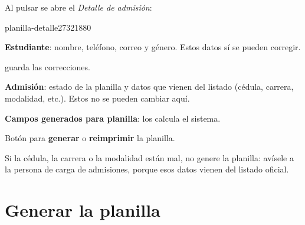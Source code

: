 Al pulsar  se abre el \emph{Detalle de admisión}:

\begin{captura}{planilla-detalle}{2732}{1880}
\end{captura}

\begin{leyenda}
  \item[1] \textbf{Estudiante}: nombre, teléfono, correo y género. Estos datos sí se pueden
        corregir.
  \item[2]  guarda las correcciones.
  \item[3] \textbf{Admisión}: estado de la planilla y datos que vienen del listado (cédula,
        carrera, modalidad, etc.). Estos no se pueden cambiar aquí.
  \item[4] \textbf{Campos generados para planilla}: los calcula el sistema.
  \item[5] Botón para \textbf{generar} o \textbf{reimprimir} la planilla.
\end{leyenda}

\begin{pasos}
\end{pasos}

\begin{importante}
Si la cédula, la carrera o la modalidad están mal, no genere la planilla: avísele a la persona
de carga de admisiones, porque esos datos vienen del listado oficial.
\end{importante}

\section{Generar la planilla}

\begin{pasos}
\end{pasos}

